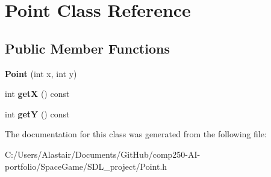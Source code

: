 \hypertarget{class_point}{}\section{Point Class Reference}
\label{class_point}
\subsection*{Public Member Functions}
\begin{DoxyCompactItemize}
\item 
\mbox{\label{class_point_a001c4958c310b248f5c26037aea38a9c}} 
{\bfseries Point} (int x, int y)
\item 
\mbox{\label{class_point_ac9d5859db121c7d1b89ca89266dca0a3}} 
int {\bfseries getX} () const
\item 
\mbox{\label{class_point_a86d10ff46e08462c45b15a8c7ef62d61}} 
int {\bfseries getY} () const
\end{DoxyCompactItemize}


The documentation for this class was generated from the following file\+:\begin{DoxyCompactItemize}
\item 
C\+:/\+Users/\+Alastair/\+Documents/\+Git\+Hub/comp250-\/\+A\+I-\/portfolio/\+Space\+Game/\+S\+D\+L\+\_\+project/Point.\+h\end{DoxyCompactItemize}
